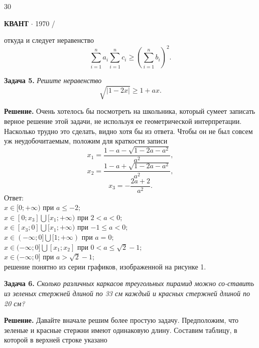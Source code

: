 {\begin{minipage}[b]{0.33333\textwidth}
\raggedright
{\large 30}
\end{minipage}%
\begin{minipage}[b]{0.33333\textwidth}
\centering
\textbf{КВАНТ} $\cdot$ \textsf{1970 \slash {}}
\end{minipage}%

\begin{multicols}{3}
откуда и следует неравенство \\
\[\sum_{i=1}^{n} a_i \sum_{i=1}^{n} c_i \geq (\sum_{i=1}^{n} b_i)^2.\] \par
\textbf{Задача 5.} \textsl{Решите неравенство}
\[\sqrt{|1 - 2x|} \geq 1 + ax.\] \par
\textbf{Решение.}  Очень хотелось бы посмотреть на школьника,
который сумеет записать верное решение этой задачи,
не используя ее геометрической интерпретации. Насколько
трудно это сделать, видно хотя бы из ответа. Чтобы он не
был совсем уж неудобочитаемым, положим для краткости записи\\
\[x_1 = \frac{1 - a - \sqrt{1 - 2a - a^2}}{a^2},\]
\[x_2 = \frac{1 - a + \sqrt{1 - 2a - a^2}}{a^2},\]
\[x_3 = -\frac{2a + 2}{a^2}.\]
Ответ:\\
$x \in [0;+\infty)$ при $a \leq -2;$ \\
$x \in [0;x_3]\bigcup[x_1;+\infty)$ при $2 < a < 0;$ \\
$x \in [x_3;0]\bigcup[x_1;+\infty)$ при $-1\leq a<0;$ \\
$x \in (-\infty;0]\bigcup[1;+\infty)$ при $a=0;$ \\
$x \in (-\infty;0]\bigcup[x_1;x_2]$ при $0 < a \leq \sqrt{2} - 1;$ \\
$x \in (-\infty;0]$ при $a > \sqrt{2} - 1;$ \\
решение понятно из серии графиков, изображенной на рисунке 1. \par
\textbf{Задача 6.} \textsl{Сколько различных каркасов
треугольных пирамид можно со-ставить из зеленых стержней
длиной по 33 см каждый и красных стержней длиной по 20 см?} \par
\textbf{Решение.}  Давайте вначале решим более
простую задачу. Предположим, что зеленые и красные
стержни имеют одинаковую длину. Составим таблицу,
в которой в верхней строке указано


\end{multicols}}
